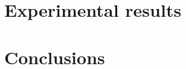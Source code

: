 \section{Experimental results} %
\label{sec:experimental_results}


\section{Conclusions} %
\label{sec:conclusions}


